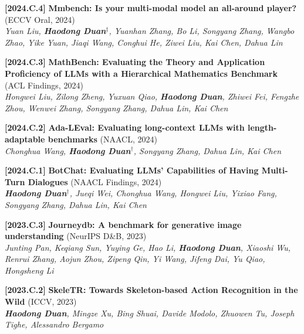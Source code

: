 \documentclass{resume}
\newcommand{\itemgap}{\vspace{-1mm}}%
\begin{document}
\itemgap

\textbf{[2024.C.4]} \textbf{Mmbench: Is your multi-modal model an all-around player?} (ECCV Oral, 2024) \\
\textit{Yuan Liu, \textbf{Haodong Duan$^\ddag$}, Yuanhan Zhang, Bo Li, Songyang Zhang, Wangbo Zhao, Yike Yuan, Jiaqi Wang, Conghui He, Ziwei Liu, Kai Chen, Dahua Lin} \\

\itemgap

\textbf{[2024.C.3]} \textbf{MathBench: Evaluating the Theory and Application Proficiency of LLMs with a Hierarchical Mathematics Benchmark} (ACL Findings, 2024) \\
\textit{Hongwei Liu, Zilong Zheng, Yuxuan Qiao, \textbf{Haodong Duan}, Zhiwei Fei, Fengzhe Zhou, Wenwei Zhang, Songyang Zhang, Dahua Lin, Kai Chen} \\

\itemgap

\textbf{[2024.C.2]} \textbf{Ada-LEval: Evaluating long-context LLMs with length-adaptable benchmarks} (NAACL, 2024) \\
\textit{Chonghua Wang, \textbf{Haodong Duan$^\dag$}, Songyang Zhang, Dahua Lin, Kai Chen} \\

\itemgap

\textbf{[2024.C.1]} \textbf{BotChat: Evaluating LLMs' Capabilities of Having Multi-Turn Dialogues} (NAACL Findings, 2024) \\
\textit{\textbf{Haodong Duan$^\dag$}, Jueqi Wei, Chonghua Wang, Hongwei Liu, Yixiao Fang, Songyang Zhang, Dahua Lin, Kai Chen} \\

\itemgap

\textbf{[2023.C.3]} \textbf{Journeydb: A benchmark for generative image understanding} (NeurIPS D\&B, 2023) \\
\textit{Junting Pan, Keqiang Sun, Yuying Ge, Hao Li, \textbf{Haodong Duan}, Xiaoshi Wu, Renrui Zhang, Aojun Zhou, Zipeng Qin, Yi Wang, Jifeng Dai, Yu Qiao, Hongsheng Li} \\

\itemgap

\textbf{[2023.C.2]} \textbf{SkeleTR: Towards Skeleton-based Action Recognition in the Wild} (ICCV, 2023) \\
\textit{\textbf{Haodong Duan}, Mingze Xu, Bing Shuai, Davide Modolo, Zhuowen Tu, Joseph Tighe, Alessandro Bergamo} \\

\itemgap
\end{document}
